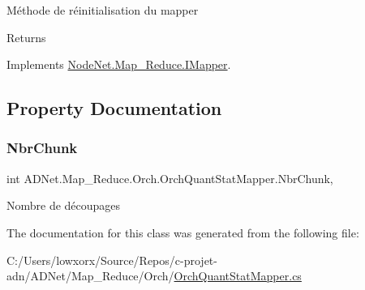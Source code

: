 Méthode de réinitialisation du mapper 

\begin{DoxyReturn}{Returns}

\end{DoxyReturn}


Implements \hyperlink{interface_node_net_1_1_map___reduce_1_1_i_mapper_a5cf335d5f21ae6bc32c774b947119134}{Node\+Net.\+Map\+\_\+\+Reduce.\+I\+Mapper}.



\subsection{Property Documentation}
\mbox{\label{class_a_d_net_1_1_map___reduce_1_1_orch_1_1_orch_quant_stat_mapper_a90f65cbeb40969deb868a363051dc280}} 
\subsubsection{\texorpdfstring{Nbr\+Chunk}{NbrChunk}}
{\footnotesize\ttfamily int A\+D\+Net.\+Map\+\_\+\+Reduce.\+Orch.\+Orch\+Quant\+Stat\+Mapper.\+Nbr\+Chunk\hspace{0.3cm}{\ttfamily [get]}, {\ttfamily [set]}}



Nombre de découpages 



The documentation for this class was generated from the following file\+:\begin{DoxyCompactItemize}
\item 
C\+:/\+Users/lowxorx/\+Source/\+Repos/c-\/projet-\/adn/\+A\+D\+Net/\+Map\+\_\+\+Reduce/\+Orch/\hyperlink{_orch_quant_stat_mapper_8cs}{Orch\+Quant\+Stat\+Mapper.\+cs}\end{DoxyCompactItemize}

